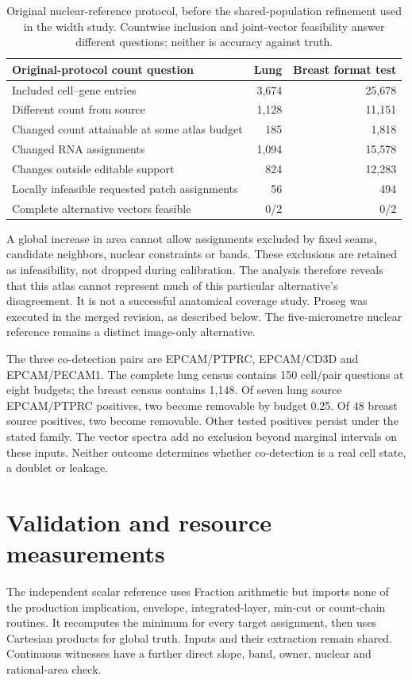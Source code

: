 \documentclass[10pt,letterpaper]{article}
\begin{document}
\begin{table}[ht]\centering
\begin{tabular}{lrr}\toprule
Original-protocol count question&Lung&Breast format test\\\midrule
Included cell--gene entries&3,674&25,678\\
Different count from source&1,128&11,151\\
Changed count attainable at some atlas budget&185&1,818\\
Changed RNA assignments&1,094&15,578\\
Changes outside editable support&824&12,283\\
Locally infeasible requested patch assignments&56&494\\
Complete alternative vectors feasible&0/2&0/2\\\bottomrule
\end{tabular}
\caption{Original nuclear-reference protocol, before the shared-population refinement used in the width study. Countwise inclusion and joint-vector feasibility answer different questions; neither is accuracy against truth.}
\end{table}

A global increase in area cannot allow assignments excluded by fixed seams, candidate neighbors, nuclear constraints or bands. These exclusions are retained as infeasibility, not dropped during calibration. The analysis therefore reveals that this atlas cannot represent much of this particular alternative's disagreement. It is not a successful anatomical coverage study. Proseg was executed in the merged revision, as described below. The five-micrometre nuclear reference remains a distinct image-only alternative.

The three co-detection pairs are EPCAM/PTPRC, EPCAM/CD3D and EPCAM/PECAM1. The complete lung census contains 150 cell/pair questions at eight budgets; the breast census contains 1,148. Of seven lung source EPCAM/PTPRC positives, two become removable by budget 0.25. Of 48 breast source positives, two become removable. Other tested positives persist under the stated family. The vector spectra add no exclusion beyond marginal intervals on these inputs. Neither outcome determines whether co-detection is a real cell state, a doublet or leakage.



\section{Validation and resource measurements}
The independent scalar reference uses Fraction arithmetic but imports none of the production implication, envelope, integrated-layer, min-cut or count-chain routines. It recomputes the minimum for every target assignment, then uses Cartesian products for global truth. Inputs and their extraction remain shared. Continuous witnesses have a further direct slope, band, owner, nuclear and rational-area check.
\end{document}
